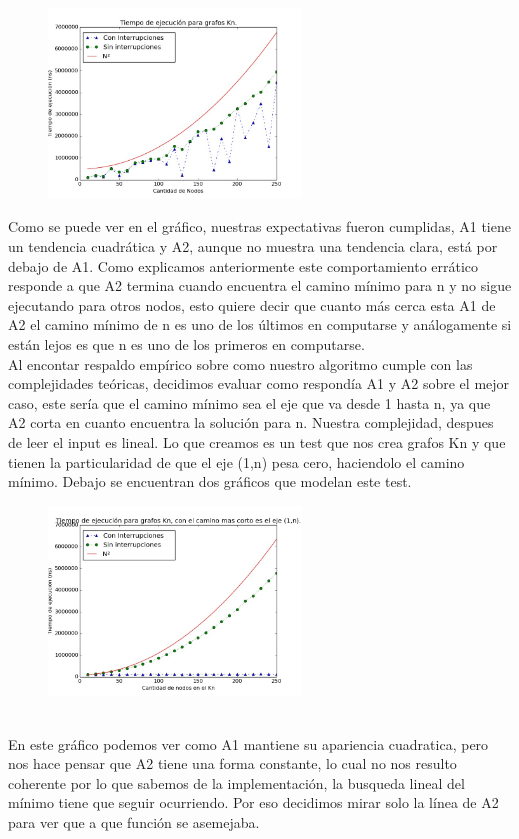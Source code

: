 \documentclass[spanish,12pt]{article}
\begin{document}
\begin{figure}[H]
\centering
\includegraphics[width=0.6\textwidth]{KnC100r3000}
\caption{}
\end{figure}

Como se puede ver en el gráfico, nuestras expectativas fueron cumplidas, A1 tiene un tendencia cuadrática y A2, aunque no muestra una tendencia clara, está por debajo de A1. Como explicamos anteriormente este comportamiento errático responde a que A2 termina cuando encuentra el camino mínimo para n y no sigue ejecutando para otros nodos, esto quiere decir que cuanto más cerca esta A1 de A2  el camino mínimo de n es uno de los últimos en computarse y análogamente si están lejos es que n es uno de los primeros en computarse.
\\
Al encontar respaldo empírico sobre como nuestro algoritmo cumple con las complejidades teóricas, decidimos evaluar como respondía A1 y A2 sobre el mejor caso, este sería que el camino mínimo sea el eje que va desde 1 hasta n, ya que A2 corta en cuanto encuentra la solución para n. Nuestra complejidad, despues de leer el input es lineal. Lo que creamos es un test que nos crea grafos Kn y que tienen la particularidad de que el eje (1,n) pesa cero, haciendolo el camino mínimo. Debajo se encuentran dos gráficos que modelan este test.

\begin{figure}[H]
\centering
\includegraphics[width=0.6\textwidth]{KnOptC150r3000}
\caption{}
\end{figure}
\\
En este gráfico podemos ver como A1 mantiene su apariencia cuadratica, pero nos hace pensar que A2 tiene una forma constante, lo cual no nos resulto coherente por lo que sabemos de la implementación, la busqueda lineal del mínimo tiene que seguir ocurriendo. Por eso decidimos mirar solo la línea de A2 para ver que a que función se asemejaba.
\end{document}
